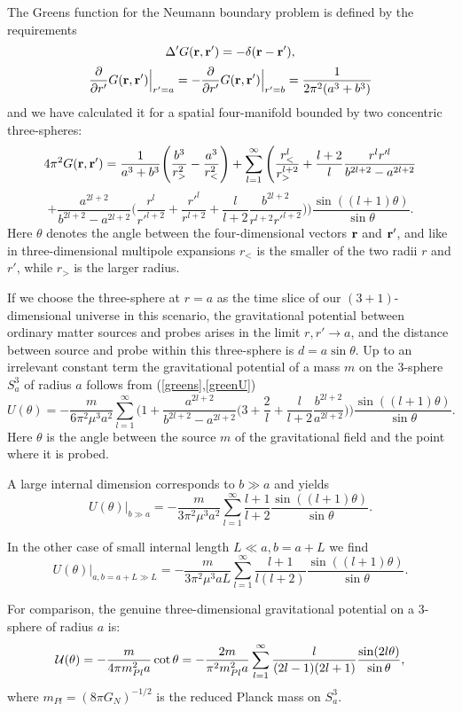 \documentclass[12pt,fleqn]{article}
\newcommand{\vek}[1]{\mbox{\bf #1}}
\newcommand{\be}{\begin{equation}}
\newcommand{\ee}{\end{equation}}
\begin{document}
The Greens function for the Neumann boundary problem
is defined by the requirements
\[
\Delta'G(\vek{r},\vek{r}')=-\delta(\vek{r}-\vek{r}'),
\]
\[
\frac{\partial}{\partial r'} G(\vek{r},\vek{r}')\Big|_{r'=a}
=-\frac{\partial}{\partial r'} G(\vek{r},\vek{r}')\Big|_{r'=b}
=\frac{1}{2\pi^2(a^3+b^3)}
\]
and
we have calculated it for a spatial four-manifold
bounded by two concentric three-spheres:
\be\label{greens}
4\pi^2G(\vek{r},\vek{r}')=
\frac{1}{a^3+b^3}\Bigg(\frac{b^3}{r_>^2}-\frac{a^3}{r_<^2}\Bigg)
+\sum_{l=1}^\infty\Bigg(\frac{r_<^l}{r_>^{l+2}}+\frac{l+2}{l}
\frac{r^lr'^l}{b^{2l+2}-a^{2l+2}}
\ee
\[
+\frac{a^{2l+2}}{b^{2l+2}-a^{2l+2}}
\Big(\frac{r^l}{r'^{l+2}}+\frac{r'^l}{r^{l+2}}
+\frac{l}{l+2}\frac{b^{2l+2}}{r^{l+2}r'^{l+2}}\Big)\Bigg)
\frac{\sin((l+1)\theta)}{\sin\theta}.
\]
Here $\theta$ denotes the angle between the four-dimensional vectors
 $\vek{r}$ and $\vek{r}'$, and like in three-dimensional multipole
expansions $r_<$ is the smaller of the two radii $r$ and $r'$,
while $r_>$ is the larger radius. 

If we choose the three-sphere at $r=a$ as the time slice of our
 $(3+1)$-dimensional universe in this scenario,
the gravitational potential between ordinary matter sources
and probes arises in the limit $r,r'\to a$,
and the distance between source and probe
 within this three-sphere is $d=a\sin\theta$. Up to an irrelevant
constant term the gravitational potential of a mass
 $m$ on the 3-sphere $S^3_a$
of radius $a$ follows from (\ref{greens},\ref{greenU})
\be\label{greensa}
U(\theta)=
-\frac{m}{6\pi^2\mu^3a^2}
\sum_{l=1}^\infty\Bigg(1+\frac{a^{2l+2}}{b^{2l+2}-a^{2l+2}}
\Big(3+\frac{2}{l}+\frac{l}{l+2}\frac{b^{2l+2}}{a^{2l+2}}\Big)\Bigg)
\frac{\sin((l+1)\theta)}{\sin\theta}.
\ee
Here $\theta$ is the angle between the source $m$
of the gravitational field and the point where it is probed.

 A large internal dimension corresponds to $b\gg a$ and yields
\be\label{Ubgga}
U(\theta)|_{b\gg a}=
-\frac{m}{3\pi^2\mu^3a^2}\sum_{l=1}^\infty\frac{l+1}{l+2}
\frac{\sin((l+1)\theta)}{\sin\theta}.
\ee

In the other case of small internal length $L\ll a,b=a+L$ we find
\be\label{UaL}
U(\theta)|_{a,b=a+L\gg L}=
-\frac{m}{3\pi^2\mu^3aL}\sum_{l=1}^\infty\frac{l+1}{l(l+2)}
\frac{\sin((l+1)\theta)}{\sin\theta}.
\ee

 For comparison, the genuine three-dimensional
gravitational potential on a 3-sphere
of radius $a$ is:
\be\label{vs3}
{\cal U}(\theta)=-\frac{m}{4\pi m_{Pl}^2 a}\cot\theta
=
-\frac{2m}{\pi^2 m_{Pl}^2a}\sum_{l=1}^\infty\frac{l}{(2l-1)(2l+1)}
\frac{\sin(2l\theta)}{\sin\theta}, 
\ee
where $m_{Pl}=(8\pi G_N)^{-1/2}$ is the reduced Planck mass
on $S^3_a$.
\end{document}
